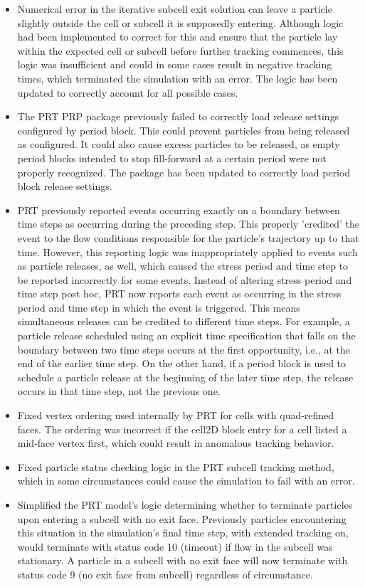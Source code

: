 \begin{itemize}
\item Numerical error in the iterative subcell exit solution can leave a particle slightly outside the cell or subcell it is supposedly entering.  Although logic had been implemented to correct for this and ensure that the particle lay within the expected cell or subcell before further tracking commences, this logic was insufficient and could in some cases result in negative tracking times, which terminated the simulation with an error.  The logic has been updated to correctly account for all possible cases.
\item The PRT PRP package previously failed to correctly load release settings configured by period block. This could prevent particles from being released as configured. It could also cause excess particles to be released, as empty period blocks intended to stop fill-forward at a certain period were not properly recognized. The package has been updated to correctly load period block release settings.
\item PRT previously reported events occurring exactly on a boundary between time steps as occurring during the preceding step. This properly 'credited' the event to the flow conditions responsible for the particle's trajectory up to that time. However, this reporting logic was inappropriately applied to events such as particle releases, as well, which caused the stress period and time step to be reported incorrectly for some events. Instead of altering stress period and time step post hoc, PRT now reports each event as occurring in the stress period and time step in which the event is triggered. This means simultaneous releases can be credited to different time steps. For example, a particle release scheduled using an explicit time specification that falls on the boundary between two time steps occurs at the first opportunity, i.e., at the end of the earlier time step. On the other hand, if a period block is used to schedule a particle release at the beginning of the later time step, the release occurs in that time step, not the previous one.
\item Fixed vertex ordering used internally by PRT for cells with quad-refined faces. The ordering was incorrect if the cell2D block entry for a cell listed a mid-face vertex first, which could result in anomalous tracking behavior.
\item Fixed particle status checking logic in the PRT subcell tracking method, which in some circumstances could cause the simulation to fail with an error.
\item Simplified the PRT model's logic determining whether to terminate particles upon entering a subcell with no exit face. Previously particles encountering this situation in the simulation's final time step, with extended tracking on, would terminate with status code 10 (timeout) if flow in the subcell was stationary. A particle in a subcell with no exit face will now terminate with status code 9 (no exit face from subcell) regardless of circumstance.

\end{itemize}
